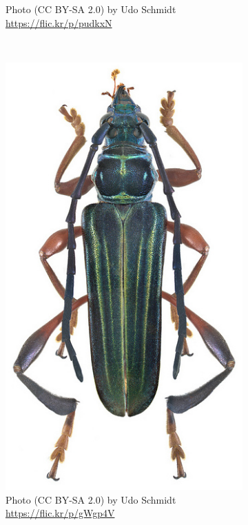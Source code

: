\documentclass[letterpaper, 11pt]{article}
\begin{document}
\begin{figure}[ht!]
\begin{subfigure}[ht!]{0.24\textwidth}
  \caption{Photo (CC BY-SA 2.0) by Udo Schmidt \url{https://flic.kr/p/pudkxN}}
  \label{fig:cerambycid1}
\end{subfigure}
    ~
 \begin{subfigure}[ht!]{0.27\textwidth}
    \includegraphics[width=\textwidth]{Cerambycid2}
  \caption{Photo (CC BY-SA 2.0) by Udo Schmidt \url{https://flic.kr/p/gWgp4V}}
  \label{fig:cerambycid2}
\end{subfigure}
    ~
\begin{subfigure}[ht!]{0.27\textwidth}

\end{subfigure}
\end{figure}
\end{document}
